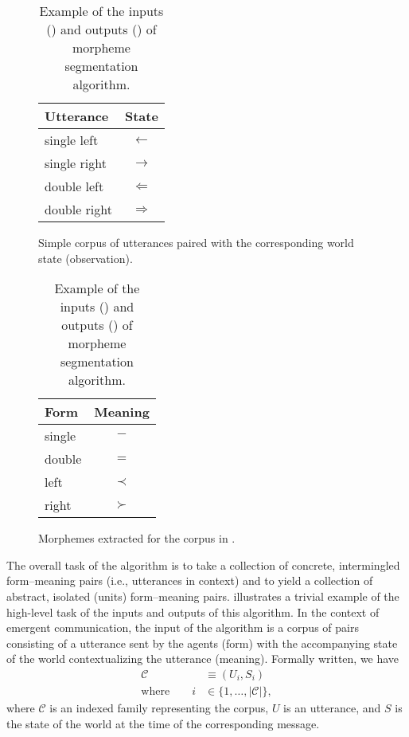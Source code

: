\begin{table}
  \centering
  \hfill
  \begin{subfigure}[t]{0.4\linewidth}
    \centering
    \begin{tabular}{lc}
      \toprule
      Utterance & State \\
      \midrule
      single left & $\leftarrow$ \\
      single right & $\rightarrow$ \\
      double left & $\Leftarrow$ \\
      double right & $\Rightarrow$ \\
      \bottomrule
    \end{tabular}
    \caption{Simple corpus of utterances paired with the corresponding world state (observation).}
    \unskip\label{tab:seg-corp}
  \end{subfigure}
  \hfill
  \begin{subfigure}[t]{0.4\linewidth}
    \centering
    \begin{tabular}{lc}
      \toprule
      Form & Meaning \\
      \midrule
      single & $-$ \\
      double & $=$ \\
      left & $\prec$ \\
      right & $\succ$ \\
      \bottomrule
    \end{tabular}
    \caption{Morphemes extracted for the corpus in .}
    \unskip\label{tab:seg-morph}
  \end{subfigure}
  \hfill
  \caption{Example of the inputs () and outputs () of morpheme segmentation algorithm.}
  \unskip\label{tab:seg-example}
\end{table}


The overall task of the algorithm is to take a collection of concrete, intermingled form--meaning pairs (i.e., utterances in context) and to yield a collection of abstract, isolated (units) form--meaning pairs.
 illustrates a trivial example of the high-level task of the inputs and outputs of this algorithm.
In the context of emergent communication, the input of the algorithm is a corpus of pairs consisting of a utterance sent by the agents (form) with the accompanying state of the world contextualizing the utterance (meaning).
Formally written, we have
\begin{align}
  \mathcal C &\equiv (U_i, S_i) \\
  \text{where}\quad\quad i &\in \{1,\dots,|\mathcal C|\}
  ,
\end{align}
where $\mathcal C$ is an indexed family representing the corpus, $U$ is an utterance, and $S$ is the state of the world at the time of the corresponding message.

